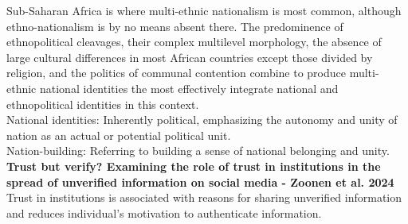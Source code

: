 \documentclass[11pt]{article}
\theoremstyle{plain}
\theoremstyle{plain}
\begin{document}
Sub-Saharan Africa is where multi-ethnic nationalism is most common, although ethno-nationalism is by no means absent there. The predominence of ethnopolitical cleavages, their complex multilevel morphology, the absence of large cultural differences in most African countries except those divided by religion, and the politics of communal contention combine to produce multi-ethnic national identities  the most effectively integrate national and ethnopolitical identities in this context.\\

National identities: Inherently political, emphasizing the autonomy and unity of nation as an actual or potential political unit.\\
Nation-building: Referring to building a sense of national belonging and unity.\\

\textbf{Trust but verify? Examining the role of trust in institutions in the spread of unverified information on social media - Zoonen et al. 2024}\\

Trust in institutions is associated with reasons for sharing unverified information and reduces individual's motivation to authenticate information.\\
\end{document}
